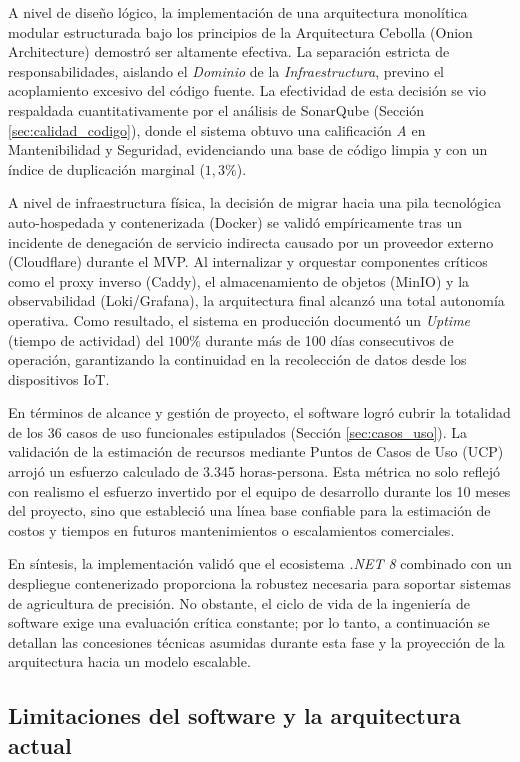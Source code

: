 A nivel de diseño lógico, la implementación de una arquitectura monolítica modular estructurada bajo los principios de la Arquitectura Cebolla (Onion Architecture) demostró ser altamente efectiva. La separación estricta de responsabilidades, aislando el \textit{Dominio} de la \textit{Infraestructura}, previno el acoplamiento excesivo del código fuente. La efectividad de esta decisión se vio respaldada cuantitativamente por el análisis de SonarQube (Sección \ref{sec:calidad_codigo}), donde el sistema obtuvo una calificación \textit{A} en Mantenibilidad y Seguridad, evidenciando una base de código limpia y con un índice de duplicación marginal ($1,3\%$).

A nivel de infraestructura física, la decisión de migrar hacia una pila tecnológica auto-hospedada y contenerizada (Docker) se validó empíricamente tras un incidente de denegación de servicio indirecta causado por un proveedor externo (Cloudflare) durante el MVP. Al internalizar y orquestar componentes críticos como el proxy inverso (Caddy), el almacenamiento de objetos (MinIO) y la observabilidad (Loki/Grafana), la arquitectura final alcanzó una total autonomía operativa. Como resultado, el sistema en producción documentó un \textit{Uptime} (tiempo de actividad) del $100\%$ durante más de 100 días consecutivos de operación, garantizando la continuidad en la recolección de datos desde los dispositivos IoT.

En términos de alcance y gestión de proyecto, el software logró cubrir la totalidad de los 36 casos de uso funcionales estipulados (Sección \ref{sec:casos_uso}). La validación de la estimación de recursos mediante Puntos de Casos de Uso (UCP) arrojó un esfuerzo calculado de 3.345 horas-persona. Esta métrica no solo reflejó con realismo el esfuerzo invertido por el equipo de desarrollo durante los 10 meses del proyecto, sino que estableció una línea base confiable para la estimación de costos y tiempos en futuros mantenimientos o escalamientos comerciales.

En síntesis, la implementación validó que el ecosistema \textit{.NET 8} combinado con un despliegue contenerizado proporciona la robustez necesaria para soportar sistemas de agricultura de precisión. No obstante, el ciclo de vida de la ingeniería de software exige una evaluación crítica constante; por lo tanto, a continuación se detallan las concesiones técnicas asumidas durante esta fase y la proyección de la arquitectura hacia un modelo escalable.

\subsection{Limitaciones del software y la arquitectura actual}
\label{subsec:software_limitaciones}

